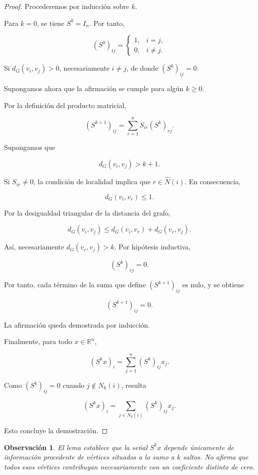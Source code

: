 \documentclass[a4paper,openany,oneside,10pt]{report}
\theoremstyle{pnlTeorema}
\theoremstyle{pnlDefinicion}
\theoremstyle{pnlObservacion}
\newtheorem{observacion}{Observación}[section]
\begin{document}
\begin{proof} Procederemos por inducción sobre \(k\).

Para \(k=0\), se tiene \(S^0=I_n\). Por tanto,

\[
(S^0)_{ij}=
\begin{cases}
1,&i=j,\\
0,&i\ne j.
\end{cases}
\]

Si \(d_G(v_i,v_j)>0\), necesariamente \(i\ne j\), de donde \((S^0)_{ij}=0\).

Supongamos ahora que la afirmación se cumple para algún \(k\ge0\).

Por la definición del producto matricial,

\[
(S^{k+1})_{ij}
=\sum_{r=1}^{n}S_{ir}(S^k)_{rj}.
\]

Supongamos que

\[
d_G(v_i,v_j)>k+1.
\]

Si \(S_{ir}\ne0\), la condición de localidad implica que \(r\in\widehat N(i)\). En consecuencia,

\[
d_G(v_i,v_r)\le1.
\]

Por la desigualdad triangular de la distancia del grafo,

\[
d_G(v_i,v_j)
\le d_G(v_i,v_r)+d_G(v_r,v_j).
\]

Así, necesariamente \(d_G(v_r,v_j)>k\). Por hipótesis inductiva,

\[
(S^k)_{rj}=0.
\]

Por tanto, cada término de la suma que define \((S^{k+1})_{ij}\) es nulo, y se obtiene

\[
(S^{k+1})_{ij}=0.
\]

La afirmación queda demostrada por inducción.

Finalmente, para todo \(x\in\mathbb R^n\),

\[
(S^kx)_i=\sum_{j=1}^n(S^k)_{ij}x_j.
\]

Como \((S^k)_{ij}=0\) cuando \(j\notin N_k(i)\), resulta

\[
(S^kx)_i=
\sum_{j\in N_k(i)}(S^k)_{ij}x_j.
\]

Esto concluye la demostración.
\end{proof}

\begin{observacion}
El lema establece que la señal \(S^kx\) depende únicamente de información procedente de vértices situados a lo sumo a \(k\) saltos. No afirma que todos esos vértices contribuyan necesariamente con un coeficiente distinto de cero.
\end{observacion}
\end{document}
